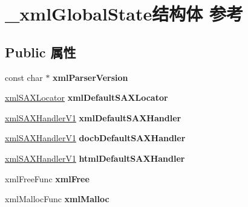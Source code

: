 \hypertarget{struct__xml_global_state}{}\section{\+\_\+xml\+Global\+State结构体 参考}
\label{struct__xml_global_state}
\subsection*{Public 属性}
\begin{DoxyCompactItemize}
\item 
\mbox{\label{struct__xml_global_state_a4af471a525f9377b8bb130c3ec631ba8}} 
const char $\ast$ {\bfseries xml\+Parser\+Version}
\item 
\mbox{\label{struct__xml_global_state_aed1adc9856d172d3de5d036f072cbb1a}} 
\hyperlink{struct__xml_s_a_x_locator}{xml\+S\+A\+X\+Locator} {\bfseries xml\+Default\+S\+A\+X\+Locator}
\item 
\mbox{\label{struct__xml_global_state_a256cd5324f2a89b49e0139c5c8e39ea1}} 
\hyperlink{struct__xml_s_a_x_handler_v1}{xml\+S\+A\+X\+Handler\+V1} {\bfseries xml\+Default\+S\+A\+X\+Handler}
\item 
\mbox{\label{struct__xml_global_state_a2450ebc67fb96e53f0df344907da8f48}} 
\hyperlink{struct__xml_s_a_x_handler_v1}{xml\+S\+A\+X\+Handler\+V1} {\bfseries docb\+Default\+S\+A\+X\+Handler}
\item 
\mbox{\label{struct__xml_global_state_a07e7a66e908fa0aef7bfa9a42e1b2cb7}} 
\hyperlink{struct__xml_s_a_x_handler_v1}{xml\+S\+A\+X\+Handler\+V1} {\bfseries html\+Default\+S\+A\+X\+Handler}
\item 
\mbox{\label{struct__xml_global_state_a842b3e02678910e93737a0c9c520d454}} 
xml\+Free\+Func {\bfseries xml\+Free}
\item 
\mbox{\label{struct__xml_global_state_aa4f9f1f20f477d6d6b108e6ecf7c4561}} 
xml\+Malloc\+Func {\bfseries xml\+Malloc}
\item 
\mbox{\label{struct__xml_global_state_a480efe13ea3f6855bae2e9a9f7f3a0c2}} 

\end{DoxyCompactItemize}
